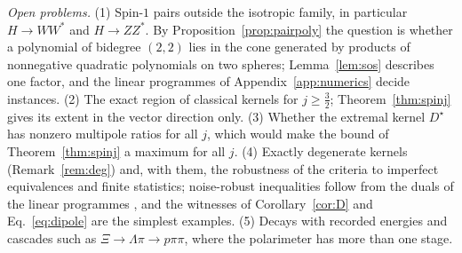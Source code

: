 \emph{Open problems.}
(1) Spin-$1$ pairs outside the isotropic family, in particular $H\to WW^*$ and $H\to ZZ^*$. By Proposition~\ref{prop:pairpoly} the question is whether a polynomial of bidegree $(2,2)$ lies in the cone generated by products of nonnegative quadratic polynomials on two spheres; Lemma~\ref{lem:sos} describes one factor, and the linear programmes of Appendix~\ref{app:numerics} decide instances.
(2) The exact region of classical kernels for $j\ge\tfrac32$; Theorem~\ref{thm:spinj} gives its extent in the vector direction only.
(3) Whether the extremal kernel $D^\star$ has nonzero multipole ratios for all $j$, which would make the bound of Theorem~\ref{thm:spinj} a maximum for all $j$.
(4) Exactly degenerate kernels (Remark~\ref{rem:deg}) and, with them, the robustness of the criteria to imperfect equivalences and finite statistics; noise-robust inequalities follow from the duals of the linear programmes \cite{selby2024lp,kunjwal2019}, and the witnesses of Corollary~\ref{cor:D} and Eq.~\eqref{eq:dipole} are the simplest examples.
(5) Decays with recorded energies and cascades such as $\Xi\to\Lambda\pi\to p\pi\pi$, where the polarimeter has more than one stage.
